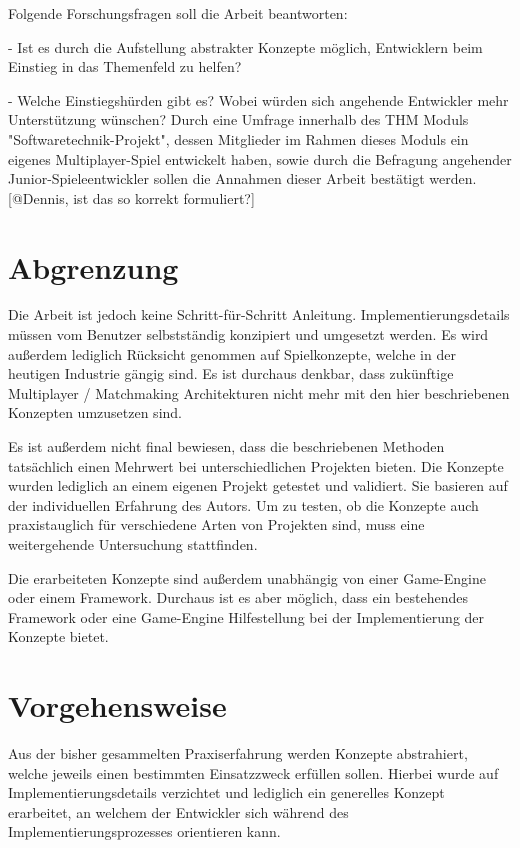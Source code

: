 Folgende Forschungsfragen soll die Arbeit beantworten:

- Ist es durch die Aufstellung abstrakter Konzepte möglich, Entwicklern beim Einstieg in das Themenfeld zu helfen? 

- Welche Einstiegshürden gibt es? Wobei würden sich angehende Entwickler mehr Unterstützung wünschen? Durch eine Umfrage innerhalb des THM Moduls "Softwaretechnik-Projekt", dessen Mitglieder im Rahmen dieses Moduls ein eigenes Multiplayer-Spiel entwickelt haben, sowie durch die Befragung angehender Junior-Spieleentwickler sollen die Annahmen dieser Arbeit bestätigt werden. [@Dennis, ist das so korrekt formuliert?]

\section{Abgrenzung}

Die Arbeit ist jedoch keine Schritt-für-Schritt Anleitung. Implementierungsdetails müssen vom Benutzer selbstständig konzipiert und umgesetzt werden. Es wird außerdem lediglich Rücksicht genommen auf Spielkonzepte, welche in der heutigen Industrie gängig sind. Es ist durchaus denkbar, dass zukünftige Multiplayer / Matchmaking Architekturen nicht mehr mit den hier beschriebenen Konzepten umzusetzen sind.

Es ist außerdem nicht final bewiesen, dass die beschriebenen Methoden tatsächlich einen Mehrwert bei unterschiedlichen Projekten bieten. Die Konzepte wurden lediglich an einem eigenen Projekt getestet und validiert. Sie basieren auf der individuellen Erfahrung des Autors. Um zu testen, ob die Konzepte auch praxistauglich für verschiedene Arten von Projekten sind, muss eine weitergehende Untersuchung stattfinden.

Die erarbeiteten Konzepte sind außerdem unabhängig von einer Game-Engine oder einem Framework. Durchaus ist es aber möglich, dass ein bestehendes Framework oder eine Game-Engine Hilfestellung bei der Implementierung der Konzepte bietet. 


\section{Vorgehensweise}

Aus der bisher gesammelten Praxiserfahrung werden Konzepte abstrahiert, welche jeweils einen bestimmten Einsatzzweck erfüllen sollen. Hierbei wurde auf Implementierungsdetails verzichtet und lediglich ein generelles Konzept erarbeitet, an welchem der Entwickler sich während des Implementierungsprozesses orientieren kann.

